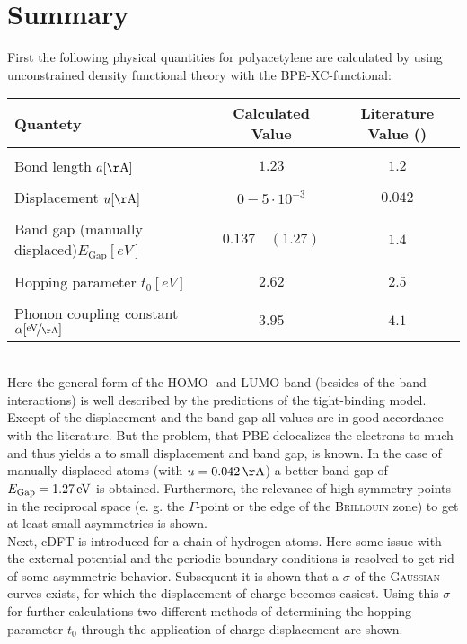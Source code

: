 \chapter{Summary}
First the following physical quantities for polyacetylene are calculated by using unconstrained density functional theory with the BPE-XC-functional:
\begin{table}[!h]
	\centering
	\begin{tabular}{l|c|c}
		Quantety & Calculated Value & Literature Value (\cite{PhysRevLett.42.1698, doi:10.1021/cr990357p})\\
		\hline \hline
		&&\\[-.3cm]
		Bond length \hfill$a [\unit{\AA}]$ & $1.23$ & $1.2$\\ \hline&&\\[-.3cm]
		Displacement \hfill$u [\unit{\AA}]$& $0 - 5\cdot10^{-3}$ & $0.042$\\ \hline&&\\[-.3cm]
		Band gap (manually displaced)\hfill$E_\text{Gap} [\unit{eV}]$ & $0.137\quad(1.27)$ & $1.4$\\ \hline &&\\[-.3cm]
		Hopping parameter \hfill$t_0 [\unit{eV}]$ & $2.62$ & $2.5$ \\ \hline&&\\[-.3cm]
		Phonon coupling constant \hspace*{2cm}$\alpha [\unitfrac{eV}{\AA}]$& $3.95$ & $4.1$
	\end{tabular}
\end{table}\\
Here the general form of the HOMO- and LUMO-band (besides of the band interactions) is well described by the predictions of the tight-binding model. Except of the displacement and the band gap all values are in good accordance with the literature. But the problem, that PBE delocalizes the electrons to much and thus yields a to small displacement and band gap, is known. In the case of manually displaced atoms (with $u = \unit[0.042]{\AA}$) a better band gap of $E_\text{Gap} = \unit[1.27]{eV}$ is obtained. Furthermore, the relevance of high symmetry points in the reciprocal space (e. g. the $\Gamma$-point or the edge of the \textsc{Brillouin} zone) to get at least small asymmetries is shown.\\
Next, cDFT is introduced for a chain of hydrogen atoms. Here some issue with the external potential and the periodic boundary conditions is resolved to get rid of some asymmetric behavior. Subsequent it is shown that a $\sigma$ of the \textsc{Gaussian} curves exists, for which the displacement of charge becomes easiest. Using this $\sigma$ for further calculations two different methods of determining the hopping parameter $t_0$ through the application of charge displacement are shown.\\
